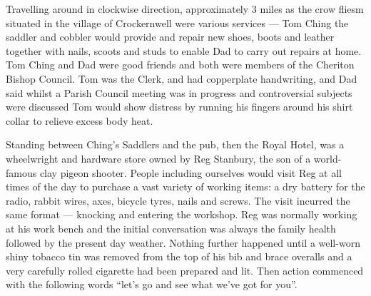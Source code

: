 Travelling around in clockwise direction, approximately 3 miles as the crow
fliesm situated in the village of Crockernwell were various services — Tom
Ching the saddler and cobbler would provide and repair new shoes, boots and
leather together with nails, scoots and studs to enable Dad to carry out
repairs at home. Tom Ching and Dad were good friends and both were members of
the Cheriton Bishop Council. Tom was the Clerk, and had copperplate
handwriting, and Dad said whilst a Parish Council meeting was in progress and
controversial subjects were discussed Tom would show distress by running his
fingers around his shirt collar to relieve excess body heat.

Standing between Ching's Saddlers and the pub, then the Royal Hotel, was a
wheelwright and hardware store owned by Reg Stanbury, the son of a world-famous
clay pigeon shooter. People including ourselves would visit Reg at all times of
the day to purchase a vast variety of working items: a dry battery for the
radio, rabbit wires, axes, bicycle tyres, nails and screws. The visit incurred
the same format — knocking and entering the workshop. Reg was normally working
at his work bench and the initial conversation was always the family health
followed by the present day weather. Nothing further happened until a well-worn
shiny tobacco tin was removed from the top of his bib and brace overalls and a
very carefully rolled cigarette had been prepared and lit. Then action
commenced with the following words ``let's go and see what we've got for
you''.

